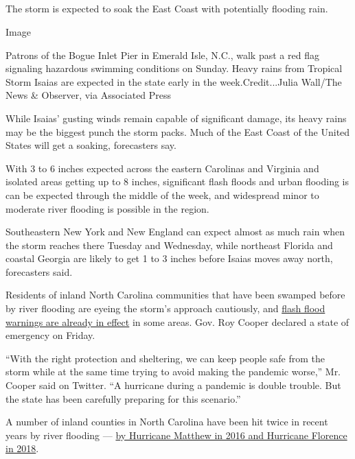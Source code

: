 \hypertarget{-4}{%
\subsection{}\label{-4}}

The storm is expected to soak the East Coast with potentially flooding
rain.

Image

Patrons of the Bogue Inlet Pier in Emerald Isle, N.C., walk past a red
flag signaling hazardous swimming conditions on Sunday. Heavy rains from
Tropical Storm Isaias are expected in the state early in the
week.Credit...Julia Wall/The News \& Observer, via Associated Press

While Isaias' gusting winds remain capable of significant damage, its
heavy rains may be the biggest punch the storm packs. Much of the East
Coast of the United States will get a soaking, forecasters say.

With 3 to 6 inches expected across the eastern Carolinas and Virginia
and isolated areas getting up to 8 inches, significant flash floods and
urban flooding is can be expected through the middle of the week, and
widespread minor to moderate river flooding is possible in the region.

Southeastern New York and New England can expect almost as much rain
when the storm reaches there Tuesday and Wednesday, while northeast
Florida and coastal Georgia are likely to get 1 to 3 inches before
Isaias moves away north, forecasters said.

Residents of inland North Carolina communities that have been swamped
before by river flooding are eyeing the storm's approach cautiously, and
\href{https://alerts.weather.gov/cap/wwacapget.php?x=NC125F5DA2F1C4.HurricaneLocalStatement.125F5DA42AA8NC.ILMHLSILM.3d2f501b896f05f00166a758bf00288a}{flash
flood warnings are already in effect} in some areas. Gov. Roy Cooper
declared a state of emergency on Friday.

``With the right protection and sheltering, we can keep people safe from
the storm while at the same time trying to avoid making the pandemic
worse,'' Mr. Cooper said on Twitter. ``A hurricane during a pandemic is
double trouble. But the state has been carefully preparing for this
scenario.''

A number of inland counties in North Carolina have been hit twice in
recent years by river flooding ---
\href{https://www.nytimes.com/2018/09/18/us/north-carolina-hurricanes-storms-history.html}{by
Hurricane Matthew in 2016 and Hurricane Florence in 2018}.

